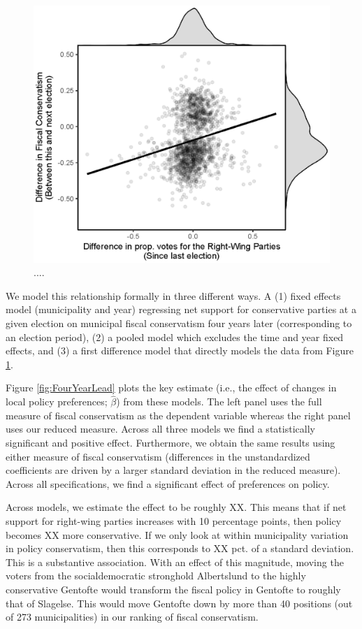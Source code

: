\documentclass[a4paper,12pt]{article}
\begin{document}
\begin{figure}[h]
	\centering
	\includegraphics[scale = 1.2]{fd_plot.eps}
	\caption{....}
	\label{fig:scatter}
\end{figure}

We model this relationship formally in three different ways. A (1) fixed effects model (municipality and year) regressing net support for conservative parties at a given election on municipal fiscal conservatism four years later (corresponding to an election period), (2) a pooled model which excludes the time and year fixed effects, and (3) a first difference model that directly models the data from Figure \ref{fig:scatter}.

Figure \ref{fig:FourYearLead} plots the key estimate (i.e., the effect of changes in local policy preferences; $\hat{\beta}$) from these models. The  left panel uses the full measure of fiscal conservatism as the dependent variable whereas the right panel uses our reduced measure. Across all three models we find a statistically significant and positive effect. Furthermore, we obtain the same results using either measure of fiscal conservatism (differences in the unstandardized coefficients are driven by a larger standard deviation in the reduced measure). Across all specifications, we find a significant effect of preferences on policy.

Across models, we estimate the effect to be roughly XX. This means that if net support for right-wing parties increases with 10 percentage points, then policy becomes XX more conservative. If we only look at within municipality variation in policy conservatism, then this corresponds to XX pct. of a standard deviation.  This is a substantive association. With an effect of this magnitude, moving the voters from the socialdemocratic stronghold Albertslund to the highly conservative Gentofte would transform the fiscal policy in Gentofte to roughly that of Slagelse. This would move Gentofte down by more than 40 positions (out of 273 municipalities) in our ranking of fiscal conservatism.
\end{document}
